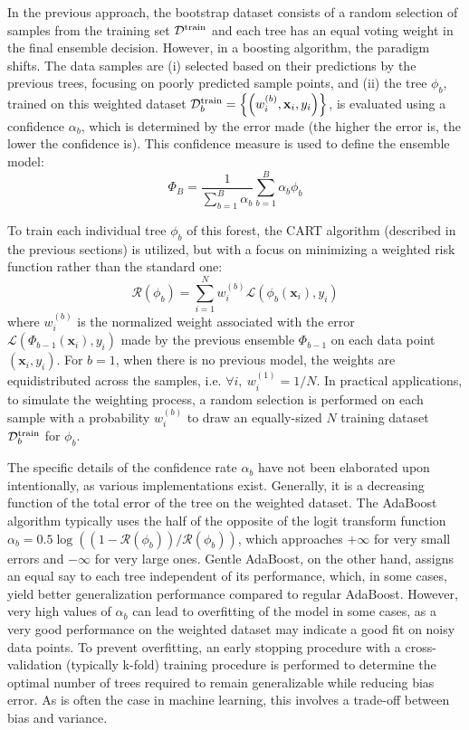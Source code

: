 \documentclass[main]{subfiles}
\begin{document}
In the previous approach, the bootstrap dataset consists of a random selection of samples from the training set $\mathcal{D}^{\text{train}}$ and each tree has an equal voting weight in the final ensemble decision. However, in a boosting algorithm,\autocite{drucker1997improving} the paradigm shifts. The data samples are (i) selected based on their predictions by the previous trees, focusing on poorly predicted sample points, and (ii) the tree $\phi_b$, trained on this weighted dataset $\mathcal{D}^{\text{train}}_b=\left\{\left(w_i^{(b)},\mathbf{x}_i,y_i\right)\right\}$, is evaluated using a confidence $\alpha_b$, which is determined by the error made (the higher the error is, the lower the confidence is). This confidence measure is used to define the ensemble model:
\begin{equation}
  \Phi_B = \frac{1}{\sum_{b=1}^{B} \alpha_b}\sum_{b=1}^{B} \alpha_b\phi_b
\end{equation}

To train each individual tree $\phi_b$ of this forest, the CART algorithm (described in the previous sections) is utilized, but with a focus on minimizing a weighted risk function rather than the standard one:
\begin{equation}
  \mathcal{R}(\phi_b) = \sum_{i=1}^N w_i^{(b)} \mathcal{L}\left(\phi_b(\mathbf{x}_i),y_i\right)
\end{equation}
where $w_i^{(b)}$ is the normalized weight associated with the error $\mathcal{L}\left(\Phi_{b-1}(\mathbf{x}_i),y_i\right)$ made by the previous ensemble $\Phi_{b-1}$ on each data point $\left(\mathbf{x}_i,y_i\right)$. For $b=1$, when there is no previous model, the weights are equidistributed across the samples, i.e. $\forall i,\ w_i^{(1)}=1/N$. In practical applications, to simulate the weighting process, a random selection is performed on each sample with a probability $w_i^{(b)}$ to draw an equally-sized $N$ training dataset $\mathcal{D}^{\text{train}}_b$ for $\phi_b$. 

The specific details of the confidence rate $\alpha_b$ have not been elaborated upon intentionally, as various implementations exist. Generally, it is a decreasing function of the total error of the tree on the weighted dataset. The AdaBoost algorithm typically uses the half of the opposite of the logit transform function $\alpha_b=0.5\log\left((1-\mathcal{R}(\phi_b))/\mathcal{R}(\phi_b)\right)$, which approaches $+\infty$ for very small errors and $-\infty$ for very large ones.\autocite{Freund_1997,schapire2013explaining} Gentle AdaBoost, on the other hand, assigns an equal say to each tree independent of its performance, which, in some cases, yield better generalization performance compared to regular AdaBoost. However, very high values of $\alpha_b$ can lead to overfitting of the model in some cases, as a very good performance on the weighted dataset may indicate a good fit on noisy data points.\autocite{schapire1998improved} To prevent overfitting, an early stopping procedure with a cross-validation (typically k-fold) training procedure is performed to determine the optimal number of trees required to remain generalizable while reducing bias error. As is often the case in machine learning, this involves a trade-off between bias and variance.
\end{document}
